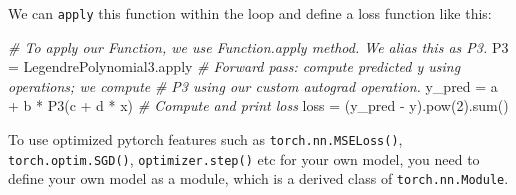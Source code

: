 \documentclass[
]{article}
\newenvironment{Shaded}{}{}
\newcommand{\BuiltInTok}[1]{\textcolor[rgb]{0.00,0.50,0.00}{#1}}
\newcommand{\CommentTok}[1]{\textcolor[rgb]{0.38,0.63,0.69}{\textit{#1}}}
\newcommand{\DecValTok}[1]{\textcolor[rgb]{0.25,0.63,0.44}{#1}}
\newcommand{\NormalTok}[1]{#1}
\newcommand{\OperatorTok}[1]{\textcolor[rgb]{0.40,0.40,0.40}{#1}}
\begin{document}
We can \texttt{apply} this function within the loop and define a loss
function like this:

\begin{Shaded}
\begin{Highlighting}[]
\CommentTok{\# To apply our Function, we use Function.apply method. We alias this as \textquotesingle{}P3\textquotesingle{}.}
\NormalTok{P3 }\OperatorTok{=}\NormalTok{ LegendrePolynomial3.}\BuiltInTok{apply}
\CommentTok{\# Forward pass: compute predicted y using operations; we compute}
\CommentTok{\# P3 using our custom autograd operation.}
\NormalTok{y\_pred }\OperatorTok{=}\NormalTok{ a }\OperatorTok{+}\NormalTok{ b }\OperatorTok{*}\NormalTok{ P3(c }\OperatorTok{+}\NormalTok{ d }\OperatorTok{*}\NormalTok{ x)}
\CommentTok{\# Compute and print loss}
\NormalTok{loss }\OperatorTok{=}\NormalTok{ (y\_pred }\OperatorTok{{-}}\NormalTok{ y).}\BuiltInTok{pow}\NormalTok{(}\DecValTok{2}\NormalTok{).}\BuiltInTok{sum}\NormalTok{()}
\end{Highlighting}
\end{Shaded}

To use optimized pytorch features such as \texttt{torch.nn.MSELoss()},
\texttt{torch.optim.SGD()}, \texttt{optimizer.step()} etc for your own
model, you need to define your own model as a module, which is a derived
class of \texttt{torch.nn.Module}.
\end{document}
